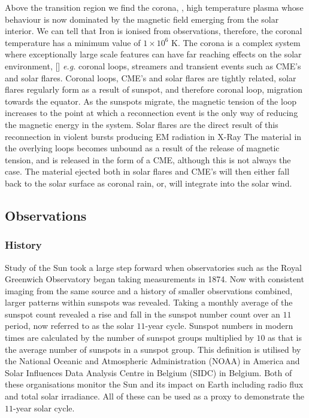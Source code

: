 Above the transition region we find the corona, \cite{Golub2009}, high temperature plasma whose behaviour is now dominated by the magnetic field emerging from the solar interior.
We can tell that Iron is ionised from observations, therefore, the coronal temperature has a minimum value of $1 \times 10^6$ K.
The corona is a complex system where exceptionally large scale features can have far reaching effects on the solar environment, [\cite{Reale2014}] \emph{e.g.} coronal loops, streamers and transient events such as CME's and solar flares.
Coronal loops, CME's and solar flares are tightly related, solar flares regularly form as a result of sunspot, and therefore coronal loop, migration towards the equator.
As the sunspots migrate, the magnetic tension of the loop increases to the point at which a reconnection event is the only way of reducing the magnetic energy in the system.
Solar flares are the direct result of this reconnection in violent bursts producing EM radiation in X-Ray
The material in the overlying loops becomes unbound as a result of the release of magnetic tension, and is released in the form of a CME, although this is not always the case.
The material ejected both in solar flares and CME's will then either fall back to the solar surface as coronal rain, or, will integrate into the solar wind.


\subsection{Observations}

\subsubsection{History}

Study of the Sun took a large step forward when observatories such as the Royal Greenwich Observatory began taking measurements in 1874.
Now with consistent imaging from the same source and a history of smaller observations combined, larger patterns within sunspots was revealed.
Taking a monthly average of the sunspot count revealed a rise and fall in the sunspot number count over an $11$ period, now referred to as the solar $11$-year cycle.
Sunspot numbers in modern times are calculated by the number of sunspot groups multiplied by $10$ as that is the average number of sunspots in a sunspot group.
This definition is utilised by the National Oceanic and Atmospheric Administration (NOAA) in America and Solar Influences Data Analysis Centre in Belgium (SIDC) in Belgium.
Both of these organisations monitor the Sun and its impact on Earth including radio flux and total solar irradiance.
All of these can be used as a proxy to demonstrate the $11$-year solar cycle.

